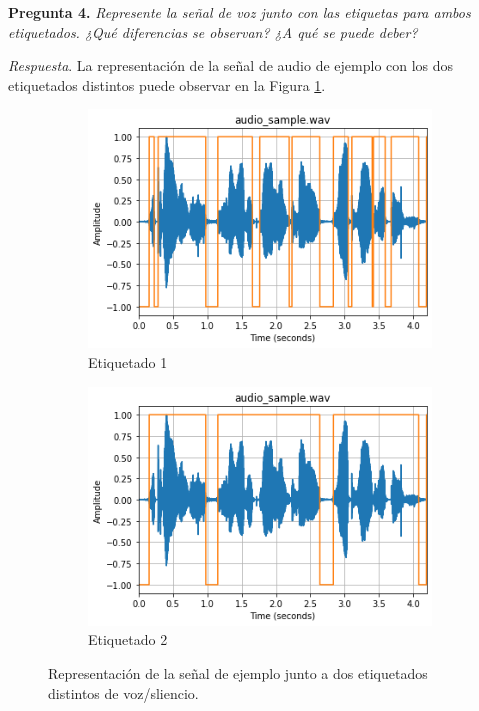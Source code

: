 \documentclass[11pt]{article}
\begin{document}
\textbf{Pregunta 4.} \textit{Represente la señal de voz junto con las etiquetas para ambos etiquetados. ¿Qué diferencias se observan? ¿A qué se puede deber?}

\textit{Respuesta}. La representación de la señal de audio de ejemplo con los dos etiquetados distintos puede observar en la Figura \ref{fig:4}.

\begin{figure}[h!]
     \centering
     \begin{subfigure}[b]{0.45\textwidth}
         \centering
         \includegraphics[width=\textwidth]{img/1_sample_labels}
         \caption{Etiquetado 1}
     \end{subfigure}
     \hfill
     \begin{subfigure}[b]{0.45\textwidth}
         \centering
         \includegraphics[width=\textwidth]{img/1_sample_labels2}
         \caption{Etiquetado 2}
     \end{subfigure}
        \caption{Representación de la señal de ejemplo junto a dos etiquetados distintos de voz/sliencio.}
        \label{fig:4}
\end{figure}
\end{document}

